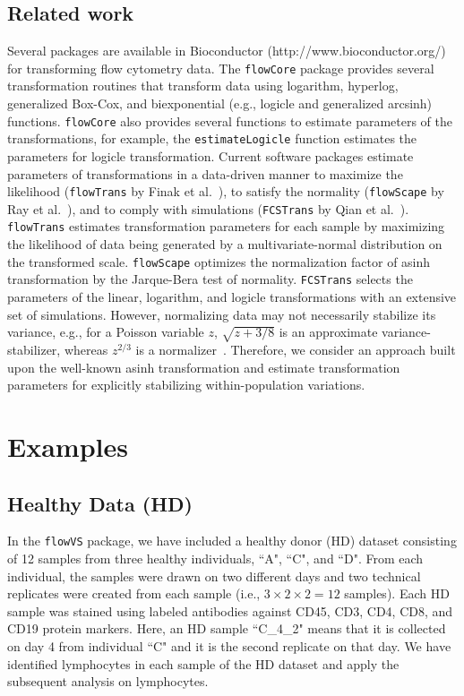 \documentclass{article}\usepackage[]{graphicx}\usepackage[]{color}
\newcommand{\Rpackage}[1]{{\texttt{#1}}}
\begin{document}
\subsection{Related work}
Several packages are available in Bioconductor (http://www.bioconductor.org/) for transforming flow cytometry data.
The \Rpackage{flowCore} package provides several transformation routines that transform data using logarithm, hyperlog, generalized Box-Cox, and biexponential (e.g., logicle and generalized arcsinh) functions.
\Rpackage{flowCore} also provides several functions to estimate parameters of the transformations, for example, the \texttt{estimateLogicle} function estimates the parameters for logicle transformation.
Current software packages estimate parameters of transformations in a data-driven manner to maximize the likelihood (\Rpackage{flowTrans} by Finak et al.~\cite{finak2010optimizing}), to satisfy the normality (\Rpackage{flowScape} by Ray et al.~\cite{ray2012computational}), and to comply with simulations (\Rpackage{FCSTrans} by Qian et al.~\cite{qian2012fcstrans}).
\Rpackage{flowTrans} estimates transformation parameters for each sample by maximizing the likelihood of data being generated by a multivariate-normal distribution on the transformed scale.
\Rpackage{flowScape} optimizes the normalization factor of asinh transformation by the Jarque-Bera test of normality.
\Rpackage{FCSTrans} selects the parameters of the linear, logarithm, and logicle transformations with an extensive set of simulations. 
However, normalizing data may not necessarily stabilize its variance, e.g., for a Poisson variable $z$, $\sqrt{z+3/8}$ is an approximate variance-stabilizer, whereas $z^{2/3}$ is a normalizer~\cite{efron1982transformation}.
Therefore, we consider an approach built upon the well-known asinh transformation and estimate transformation parameters for explicitly stabilizing within-population variations.

\section{Examples}
\subsection{Healthy Data (HD)}
In the \Rpackage{flowVS} package, we have included a healthy donor (HD) dataset consisting of 12 samples from three healthy individuals, ``A", ``C", and ``D".
From each individual, the samples were drawn on two different days and two technical replicates were created from each sample (i.e., $3\times 2 \times 2 = 12$ samples).
Each HD sample was stained using labeled antibodies against CD45, CD3, CD4, CD8, and CD19 protein markers.
Here, an HD sample ``C\_4\_2" means that  it is collected on day 4 from individual ``C" and it is the second replicate on that day.
We have identified lymphocytes in each sample of the HD dataset and apply the subsequent analysis on lymphocytes.
\end{document}
